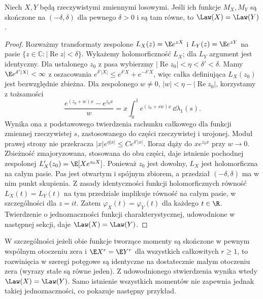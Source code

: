 \begin{stwierdzenie}
Niech $X,Y$ będą rzeczywistymi zmiennymi losowymi.
Jeśli ich funkcje $M_X,M_Y$ są skończone na
$(-\delta,\delta)$ dla pewnego $\delta>0$
i są tam równe, to $\Law(X)=\Law(Y)$.
\end{stwierdzenie}
\begin{proof}
Rozważmy transformaty zespolone
$L_X(z)=\E e^{zX}$ i $L_Y(z)=\E e^{zY}$
na pasie $\{z\in\mathbb C:|\operatorname{Re}z|<\delta\}$.
Wykażemy holomorficzność $L_X$; dla $L_Y$ argument
jest identyczny. Dla ustalonego $z_0$ z pasa wybierzmy
$|\operatorname{Re}z_0|<\eta<\delta'<\delta$.
Mamy $\E e^{\delta'|X|}<\infty$ z oszacowania
$e^{\delta'|X|}\leq e^{\delta'X}+e^{-\delta'X}$,
więc całka definiująca $L_X(z_0)$ jest bezwzględnie zbieżna.
Dla zespolonego $w\ne0$, $|w|<\eta-|\operatorname{Re}z_0|$,
korzystamy z tożsamości
\[
\frac{e^{(z_0+w)x}-e^{z_0x}}{w}
=x\int_0^1 e^{(z_0+sw)x}\,\dd\lambda_1(s).
\]
Wynika ona z podstawowego twierdzenia rachunku całkowego
dla funkcji zmiennej rzeczywistej $s$, zastosowanego
do części rzeczywistej i urojonej.
Moduł prawej strony nie przekracza
$|x|e^{\eta|x|}\leq C e^{\delta'|x|}$.
Iloraz dąży do $xe^{z_0x}$ przy $w\to0$.
Zbieżność zmajoryzowana, stosowana do obu części,
daje istnienie pochodnej zespolonej
$L_X'(z_0)=\E[Xe^{z_0X}]$.
Ponieważ $z_0$ jest dowolny, $L_X$ jest holomorficzna
na całym pasie.
Pas jest otwartym i spójnym zbiorem, a przedział
$(-\delta,\delta)$ ma w nim punkt skupienia.
Z zasady identyczności funkcji holomorficznych równość
$L_X(t)=L_Y(t)$ na tym przedziale implikuje
równość na całym pasie, w szczególności dla $z=it$.
Zatem $\varphi_X(t)=\varphi_Y(t)$ dla każdego $t\in\R$.
Twierdzenie o jednoznaczności funkcji charakterystycznej,
udowodnione w następnej sekcji, daje $\Law(X)=\Law(Y)$.
\end{proof}

W szczególności jeżeli obie funkcje tworzące momenty
są skończone w pewnym wspólnym otoczeniu zera i
$\E X^r=\E Y^r$ dla wszystkich całkowitych $r\geq1$,
to rozwinięcia w szeregi potęgowe są identyczne
na dostatecznie małym otoczeniu zera (wyrazy stałe
są równe jeden). Z udowodnionego stwierdzenia wynika
wtedy $\Law(X)=\Law(Y)$. Samo istnienie wszystkich
momentów nie zapewnia jednak takiej jednoznaczności,
co pokazuje następny przykład.


